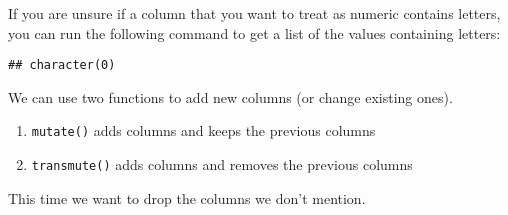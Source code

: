 \documentclass[]{book}
\newenvironment{Shaded}{\begin{snugshade}}{\end{snugshade}}
\newcommand{\KeywordTok}[1]{\textcolor[rgb]{0.13,0.29,0.53}{\textbf{{#1}}}}
\newcommand{\DataTypeTok}[1]{\textcolor[rgb]{0.13,0.29,0.53}{{#1}}}
\newcommand{\DecValTok}[1]{\textcolor[rgb]{0.00,0.00,0.81}{{#1}}}
\newcommand{\StringTok}[1]{\textcolor[rgb]{0.31,0.60,0.02}{{#1}}}
\newcommand{\OtherTok}[1]{\textcolor[rgb]{0.56,0.35,0.01}{{#1}}}
\newcommand{\NormalTok}[1]{{#1}}
\providecommand{\tightlist}{%
  \setlength{\itemsep}{0pt}\setlength{\parskip}{0pt}}
\theoremstyle{definition}
\theoremstyle{definition}
\theoremstyle{remark}
\begin{document}
If you are unsure if a column that you want to treat as numeric contains
letters, you can run the following command to get a list of the values
containing letters:

\begin{Shaded}
\end{Shaded}

\begin{verbatim}
## character(0)
\end{verbatim}

We can use two functions to add new columns (or change existing ones).

\begin{enumerate}
\def\labelenumi{\arabic{enumi}.}
\tightlist
\item
  \texttt{mutate()} adds columns and keeps the previous columns
\item
  \texttt{transmute()} adds columns and removes the previous columns
\end{enumerate}

This time we want to drop the columns we don't mention.

\begin{Shaded}
\end{Shaded}
\end{document}
